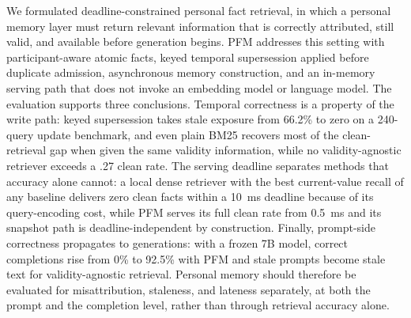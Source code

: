\documentclass[letterpaper]{article} %
\begin{document}
We formulated deadline-constrained personal fact retrieval, in which a personal memory layer must return relevant information that is correctly attributed, still valid, and available before generation begins. PFM addresses this setting with participant-aware atomic facts, keyed temporal supersession applied before duplicate admission, asynchronous memory construction, and an in-memory serving path that does not invoke an embedding model or language model. The evaluation supports three conclusions. Temporal correctness is a property of the write path: keyed supersession takes stale exposure from 66.2\% to zero on a 240-query update benchmark, and even plain BM25 recovers most of the clean-retrieval gap when given the same validity information, while no validity-agnostic retriever exceeds a .27 clean rate. The serving deadline separates methods that accuracy alone cannot: a local dense retriever with the best current-value recall of any baseline delivers zero clean facts within a 10~ms deadline because of its query-encoding cost, while PFM serves its full clean rate from 0.5~ms and its snapshot path is deadline-independent by construction. Finally, prompt-side correctness propagates to generations: with a frozen 7B model, correct completions rise from 0\% to 92.5\% with PFM and stale prompts become stale text for validity-agnostic retrieval. Personal memory should therefore be evaluated for misattribution, staleness, and lateness separately, at both the prompt and the completion level, rather than through retrieval accuracy alone.

\end{document}

